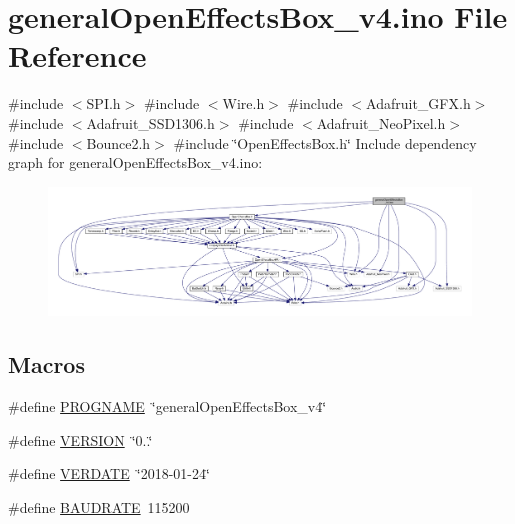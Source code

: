 \hypertarget{general_open_effects_box__v4_8ino}{}\section{general\+Open\+Effects\+Box\+\_\+v4.\+ino File Reference}
\label{general_open_effects_box__v4_8ino}
{\ttfamily \#include $<$S\+P\+I.\+h$>$}\newline
{\ttfamily \#include $<$Wire.\+h$>$}\newline
{\ttfamily \#include $<$Adafruit\+\_\+\+G\+F\+X.\+h$>$}\newline
{\ttfamily \#include $<$Adafruit\+\_\+\+S\+S\+D1306.\+h$>$}\newline
{\ttfamily \#include $<$Adafruit\+\_\+\+Neo\+Pixel.\+h$>$}\newline
{\ttfamily \#include $<$Bounce2.\+h$>$}\newline
{\ttfamily \#include \char`\"{}Open\+Effects\+Box.\+h\char`\"{}}\newline
Include dependency graph for general\+Open\+Effects\+Box\+\_\+v4.\+ino\+:\nopagebreak
\begin{figure}[H]
\begin{center}
\leavevmode
\includegraphics[width=350pt]{general_open_effects_box__v4_8ino__incl}
\end{center}
\end{figure}
\subsection*{Macros}
\begin{DoxyCompactItemize}
\item 
\#define \mbox{\hyperlink{general_open_effects_box__v4_8ino_a8c9afb758de9a0355c93fc926b8ce6b1}{P\+R\+O\+G\+N\+A\+ME}}~\char`\"{}general\+Open\+Effects\+Box\+\_\+v4\char`\"{}
\item 
\#define \mbox{\hyperlink{general_open_effects_box__v4_8ino_a1c6d5de492ac61ad29aec7aa9a436bbf}{V\+E\+R\+S\+I\+ON}}~\char`\"{}0..\char`\"{}
\item 
\#define \mbox{\hyperlink{general_open_effects_box__v4_8ino_a35c89e6edf9f55057ac7f4dc0e808fc3}{V\+E\+R\+D\+A\+TE}}~\char`\"{}2018-\/01-\/24\char`\"{}
\item 
\#define \mbox{\hyperlink{general_open_effects_box__v4_8ino_a734bbab06e1a9fd2e5522db0221ff6e3}{B\+A\+U\+D\+R\+A\+TE}}~115200
\end{DoxyCompactItemize}
